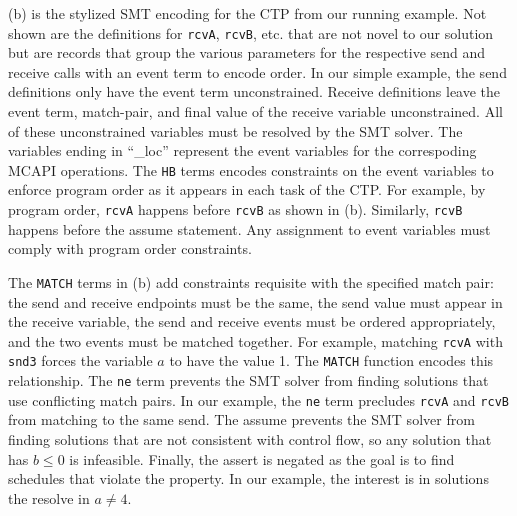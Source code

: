(b) is the stylized SMT encoding for the CTP from our running
example. Not shown are the definitions for \texttt{rcvA}, \texttt{rcvB}, etc.
that are not novel to our solution but are records that group the various
parameters for the respective send and receive calls with an event term to
encode order. In our simple example, the send definitions only have the event
term unconstrained. Receive definitions leave the event term, match-pair, and final
value of the receive variable unconstrained. All of these unconstrained variables must
be resolved by the SMT solver. The variables ending in ``\_loc'' represent the
event variables for the correspoding MCAPI operations. The \texttt{HB} terms
encodes constraints on the event variables to enforce program order as it
appears in each task of the CTP. For example, by program order, \texttt{rcvA}
happens before \texttt{rcvB} as shown in (b). Similarly,
\texttt{rcvB} happens before the assume statement. Any assignment to event
variables must comply with program order constraints.

The \texttt{MATCH} terms in (b) add constraints
requisite with the specified match pair: the send and
receive endpoints must be the same, the send value must appear in the
receive variable, the send and receive events must be ordered
appropriately, and the two events must be matched together. For
example, matching \texttt{rcvA} with \texttt{snd3} forces the variable
$a$ to have the value 1. The \texttt{MATCH} function encodes this
relationship. The \texttt{ne} term prevents the SMT solver from
finding solutions that use conflicting match pairs. In our example,
the \texttt{ne} term precludes \texttt{rcvA} and \texttt{rcvB} from
matching to the same send. The assume prevents the SMT solver from
finding solutions that are not consistent with control flow, so any
solution that has $b \leq 0$ is infeasible. Finally, the assert is negated
as the goal is to find schedules that violate the property. In our
example, the interest is in solutions the resolve in $a \neq 4$.

